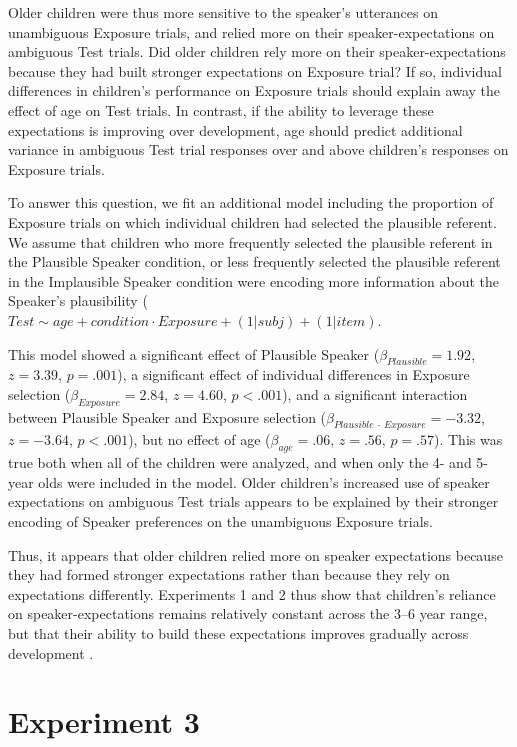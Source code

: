 \documentclass[man,floatsintext]{apa6}
\begin{document}
Older children were thus more sensitive to the speaker's utterances on unambiguous Exposure trials, and relied more on their speaker-expectations on ambiguous Test trials. Did older children rely more on their speaker-expectations because they had built stronger expectations on Exposure trial? If so, individual differences in children's performance on Exposure trials should explain away the effect of age on Test trials. In contrast, if the ability to leverage these expectations is improving over development, age should predict additional variance in ambiguous Test trial responses over and above children's responses on Exposure trials.

To answer this question, we fit an additional model including the proportion of Exposure trials on which individual children had selected the plausible referent. We assume that children who more frequently selected the plausible referent in the Plausible Speaker condition, or less frequently selected the plausible referent in the Implausible Speaker condition were encoding more information about the Speaker's plausibility ($Test \sim age + condition \cdot Exposure + (1|subj) + (1|item)$.

This model showed a significant effect of Plausible Speaker ($\beta_{Plausible} = 1.92$, $z = 3.39$, $p = .001$), a significant effect of individual differences in Exposure selection ($\beta_{Exposure} = 2.84$, $z = 4.60$, $p < .001$), and a significant interaction between Plausible Speaker and Exposure selection ($\beta_{Plausible \: \cdot \: Exposure} = -3.32$, $z = -3.64$, $p < .001$), but no effect of age ($\beta_{age} = .06$, $z = .56$, $p = .57$). This was true both when all of the children were analyzed, and when only the 4- and 5- year olds were included in the model. Older children's increased use of speaker expectations on ambiguous Test trials appears to be explained by their stronger encoding of Speaker preferences on the unambiguous Exposure trials.

Thus, it appears that older children relied more on speaker expectations because they had formed stronger expectations rather than because they rely on expectations differently. Experiments 1 and 2 thus show that children's reliance on speaker-expectations remains relatively constant across the 3--6 year range, but that their ability to build these expectations improves gradually across development \cite{graham2014,matthews2010}.


\section{Experiment 3}
\end{document}

